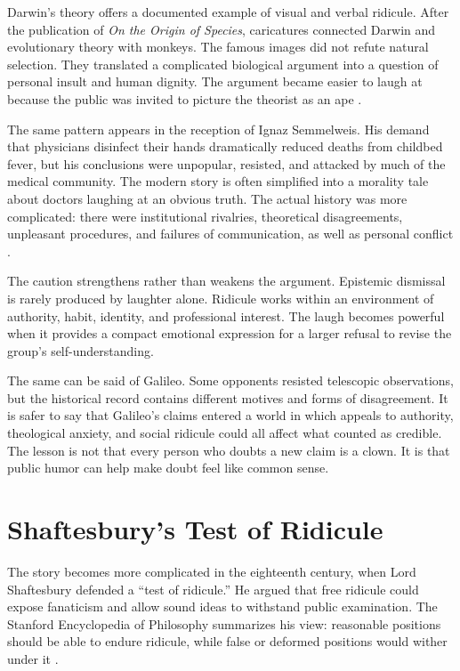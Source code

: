﻿\documentclass[12pt,a4paper]{book}
\begin{document}
Darwin's theory offers a documented example of visual and verbal ridicule. After the publication of \emph{On the Origin of Species}, caricatures connected Darwin and evolutionary theory with monkeys. The famous images did not refute natural selection. They translated a complicated biological argument into a question of personal insult and human dignity. The argument became easier to laugh at because the public was invited to picture the theorist as an ape \cite{darwinproject2024}.

The same pattern appears in the reception of Ignaz Semmelweis. His demand that physicians disinfect their hands dramatically reduced deaths from childbed fever, but his conclusions were unpopular, resisted, and attacked by much of the medical community. The modern story is often simplified into a morality tale about doctors laughing at an obvious truth. The actual history was more complicated: there were institutional rivalries, theoretical disagreements, unpleasant procedures, and failures of communication, as well as personal conflict \cite{semmelweis2024}.

The caution strengthens rather than weakens the argument. Epistemic dismissal is rarely produced by laughter alone. Ridicule works within an environment of authority, habit, identity, and professional interest. The laugh becomes powerful when it provides a compact emotional expression for a larger refusal to revise the group's self-understanding.

The same can be said of Galileo. Some opponents resisted telescopic observations, but the historical record contains different motives and forms of disagreement. It is safer to say that Galileo's claims entered a world in which appeals to authority, theological anxiety, and social ridicule could all affect what counted as credible. The lesson is not that every person who doubts a new claim is a clown. It is that public humor can help make doubt feel like common sense.

\section{Shaftesbury's Test of Ridicule}

The story becomes more complicated in the eighteenth century, when Lord Shaftesbury defended a ``test of ridicule.'' He argued that free ridicule could expose fanaticism and allow sound ideas to withstand public examination. The Stanford Encyclopedia of Philosophy summarizes his view: reasonable positions should be able to endure ridicule, while false or deformed positions would wither under it \cite{shaftesbury2024}.
\end{document}
